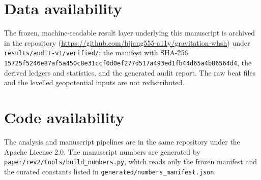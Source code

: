 \documentclass[11pt,a4paper]{article}
\begin{document}
\section*{Data availability}
The frozen, machine-readable result layer underlying this manuscript is
archived in the repository
(\url{https://github.com/hjiang555-a11y/gravitation-whsh}) under
\texttt{results/audit-v1/verified/}: the manifest with SHA-256
\texttt{15725f5246e87af5a450c8e31ccf0d0ef277d517a493ed1fb44d65a4b86564d4},
the derived ledgers and statistics, and the generated audit report. The raw
beat files and the levelled geopotential inputs are not redistributed.

\section*{Code availability}
The analysis and manuscript pipelines are in the same repository under the
Apache License 2.0. The manuscript numbers are generated by
\texttt{paper/rev2/tools/build\_numbers.py}, which reads only the frozen
manifest and the curated constants listed in
\texttt{generated/numbers\_manifest.json}.

\appendix

\end{document}
